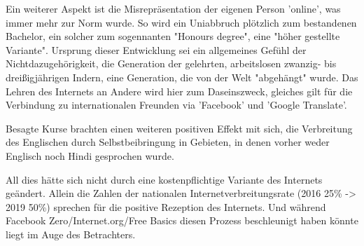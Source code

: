 \documentclass{article}
\begin{document}
\medskip

 Ein weiterer Aspekt ist die Misrepräsentation der eigenen Person 'online', was immer mehr zur Norm wurde. So wird ein Uniabbruch plötzlich zum bestandenen Bachelor, ein solcher zum sogennanten "Honours degree", eine "höher gestellte Variante". Ursprung dieser Entwicklung sei ein allgemeines Gefühl der Nichtdazugehörigkeit, die Generation der gelehrten, arbeitslosen zwanzig- bis dreißigjährigen Indern, eine Generation, die von der Welt "abgehängt" wurde. Das Lehren des Internets an Andere wird hier zum Daseinszweck, gleiches gilt für die Verbindung zu internationalen Freunden via 'Facebook' und 'Google Translate'.

\medskip

Besagte Kurse brachten einen weiteren positiven Effekt mit sich, die Verbreitung des Englischen durch Selbstbeibringung in Gebieten, in denen vorher weder Englisch noch Hindi gesprochen wurde.

\medskip

All dies hätte sich nicht durch eine kostenpflichtige Variante des Internets geändert. Allein die Zahlen der nationalen Internetverbreitungsrate (2016 25\% \--> 2019 50\%) sprechen für die positive Rezeption des Internets. Und während Facebook Zero/Internet.org/Free Basics diesen Prozess beschleunigt haben könnte liegt im Auge des Betrachters. %


\end{document}
